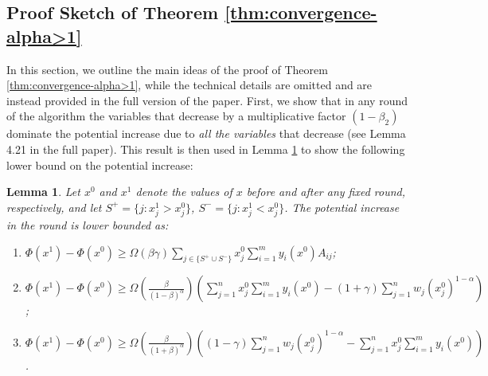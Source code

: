 \documentclass[11pt]{article}
\newtheorem{lemma}[theorem]{Lemma}
\begin{document}
\else
\subsection{Proof Sketch of Theorem \ref{thm:convergence-alpha>1}}\label{section:alpha>1}

In this section, we outline the main ideas of the proof of Theorem \ref{thm:convergence-alpha>1}, while the technical details are omitted and are instead provided in the {full version of the paper}. 
First, we show that in any round of the algorithm the variables that decrease by a multiplicative factor $(1-\beta_2)$ dominate the potential increase due to \emph{all the variables} that decrease (see Lemma {4.21} in the full paper). 
This result is then used in Lemma \ref{lemma:potential-increase-alpha>1} to show the following lower bound on the potential increase:



\begin{lemma}\label{lemma:potential-increase-alpha>1}
Let $x^0$ and $x^1$ denote the values of $x$ before and after any fixed round, respectively, and let $S^+ = \{j: x_j^1 > x_j^0\}$, $S^- = \{j: x_j^1 < x_j^0\}$. The potential increase in the round is lower bounded as:
\begin{enumerate}[noitemsep, topsep=5pt]
\item $\Phi(x^1) - \Phi(x^0) \geq \Omega(\beta\gamma)\sum_{j\in\{S^+\cup S^-\}} x_j^0\sum_{i=1}^m y_i(x^0)A_{ij}$;
\item $\Phi(x^1) - \Phi(x^0) \geq \Omega\left(\frac{\beta}{(1-\beta)^{\alpha}}\right) \left(\sum_{j=1}^n x_j^0 \sum_{i=1}^m y_i(x^0) - (1+\gamma) \sum_{j=1}^nw_j (x_j^0)^{1-\alpha}\right)$;
\item $\Phi(x^1) - \Phi(x^0) \geq \Omega\left(\frac{\beta}{(1+\beta)^{\alpha}}\right) \left( (1-\gamma)\sum_{j=1}^n w_j (x_j^0)^{1-\alpha} - \sum_{j=1}^n x_j^0 \sum_{i=1}^m y_i(x^0)\right)$.
\end{enumerate}
\end{lemma}
\end{document}
